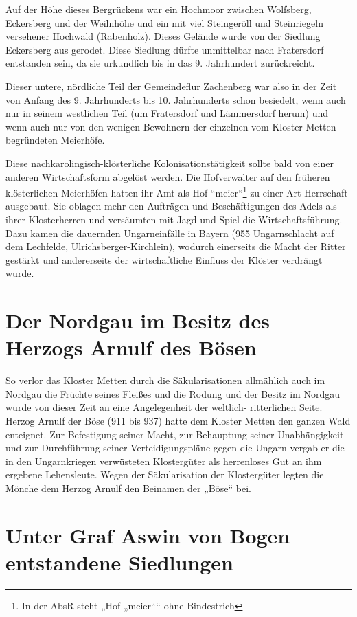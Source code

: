 \documentclass{book}
\begin{document}
Auf der Höhe dieses Bergrückens war ein Hochmoor zwischen Wolfsberg,
Eckersberg und der Weilnhöhe und ein mit viel Steingeröll und
Steinriegeln versehener Hochwald (Rabenholz). Dieses Gelände wurde von
der Siedlung Eckersberg aus gerodet. Diese Siedlung dürfte unmittelbar
nach Fratersdorf entstanden sein, da sie urkundlich bis in das 9.
Jahrhundert zurückreicht.

Dieser untere, nördliche Teil der Gemeindeflur Zachenberg war also in
der Zeit von Anfang des 9. Jahrhunderts bis 10. Jahrhunderts schon
besiedelt, wenn auch nur in seinem westlichen Teil (um Fratersdorf und
Lämmersdorf herum) und wenn auch nur von den wenigen Bewohnern der
einzelnen vom Kloster Metten begründeten Meierhöfe.

Diese nachkarolingisch-klösterliche Kolonisationstätigkeit sollte bald
von einer anderen Wirtschaftsform abgelöst werden. Die Hofverwalter auf
den früheren klösterlichen Meierhöfen hatten ihr Amt als
Hof-“meier“\footnote{In der AbsR steht „Hof „meier““ ohne Bindestrich}
zu einer Art Herrschaft ausgebaut. Sie oblagen mehr den Aufträgen und
Beschäftigungen des Adels als ihrer Klosterherren und versäumten mit
Jagd und Spiel die Wirtschaftsführung. Dazu kamen die dauernden
Ungarneinfälle in Bayern (955 Ungarnschlacht auf dem Lechfelde,
Ulrichsberger-Kirchlein), wodurch einerseits die Macht der Ritter
gestärkt und andererseits der wirtschaftliche Einfluss der Klöster
verdrängt wurde.

\section{Der Nordgau im Besitz des Herzogs Arnulf des Bösen}

So verlor das Kloster Metten durch die Säkularisationen allmählich auch
im Nordgau die Früchte seines Fleißes und die Rodung und der Besitz im
Nordgau wurde von dieser Zeit an eine Angelegenheit der weltlich-
ritterlichen Seite. Herzog Arnulf der Böse (911 bis 937) hatte dem
Kloster Metten den ganzen Wald enteignet. Zur Befestigung seiner Macht,
zur Behauptung seiner Unabhängigkeit und zur Durchführung seiner
Verteidigungspläne gegen die Ungarn vergab er die in den Ungarnkriegen
verwüsteten Klostergüter als herrenloses Gut an ihm ergebene
Lehensleute. Wegen der Säkularisation der Klostergüter legten die Mönche
dem Herzog Arnulf den Beinamen der „Böse“ bei.

\section{Unter Graf Aswin von Bogen entstandene Siedlungen}
\end{document}
